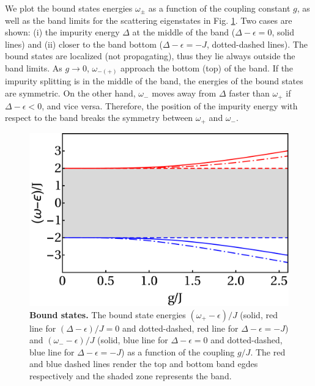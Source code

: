 \documentclass[aps,pra,twocolumn,floatfix,superscriptaddress]{revtex4-1}%
\begin{document}
We plot the bound states energies $\omega_\pm$ as a function of the coupling constant $g$, as well as the band limits for the scattering eigenstates in Fig. \ref{fig:E_bound}. 
Two cases are shown: (i) the impurity energy $\Delta$ at the middle of the band ($\Delta-\epsilon=0$, solid lines) and (ii) closer to the band bottom  ($\Delta-\epsilon=-J$, dotted-dashed lines). 
The bound states are localized (not propagating), thus they lie always outside the band limits.
As $g\to 0$, $\omega_{-(+)}$   approach the bottom (top) of the band.
If  the impurity splitting  is in the middle of the band, the energies of the bound states are  symmetric.
On the other hand, $\omega_-$ moves away from $\Delta$ faster than $\omega_+$ if $\Delta-\epsilon<0$, and vice versa. Therefore, the position of the impurity energy with respect to the band breaks the symmetry between $\omega_+$ and $\omega_-$.

\begin{figure}[thb!]
\includegraphics[width=1\columnwidth]{E_bound_all.pdf}
\caption{{\bf Bound states.} The bound state energies $(\omega_+-\epsilon)/J$ (solid, red line for $(\Delta-\epsilon)/J=0$ and dotted-dashed, red line for $\Delta-\epsilon=-J$) and $(\omega_--\epsilon)/J$ (solid, blue line for $\Delta-\epsilon=0$ and dotted-dashed, blue line for $\Delta-\epsilon=-J$) as a function of the coupling $g/J$. The red and blue dashed lines render the top and bottom band egdes respectively and the shaded zone represents the band.}\label{fig:E_bound}
\end{figure}
 

\end{document}
